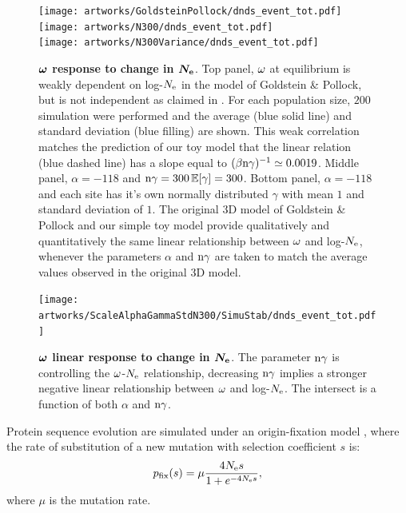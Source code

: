 \documentclass{article}
\begin{document}
\begin{figure}[htb!]
\begin{mdframed}
\centering
	\texttt{[image: artworks/GoldsteinPollock/dnds\_event\_tot.pdf]}\\
	\texttt{[image: artworks/N300/dnds\_event\_tot.pdf]}\\
	\texttt{[image: artworks/N300Variance/dnds\_event\_tot.pdf]}\\
	\caption{
		\textbf{$\bm{\omega}$ response to change in $\bm{N_{\mathrm{e}}}$}.
		Top panel, $\omega$ at equilibrium is weakly dependent on log-$N_{\mathrm{e}}$ in the model of Goldstein \& Pollock, but is not independent as claimed in \cite{Goldstein2013}.
		For each population size, $200$ simulation were performed and the average (blue solid line) and standard deviation (blue filling) are shown.
		This weak correlation matches the prediction of our toy model that the linear relation (blue dashed line) has a slope equal to $(\beta  \text{n} \gamma)^{-1} \simeq 0.0019$.
		Middle panel, $\alpha=-118$ and $\text{n} \gamma=300\operatorname{\mathbb{E}}[\gamma]=300$.
		Bottom panel, $\alpha=-118$ and each site has it's own normally distributed $\gamma$ with mean $1$ and standard deviation of $1$.
		The original $3$D model of Goldstein \& Pollock and our simple toy model provide qualitatively and quantitatively the same linear relationship between $\omega$ and log-$N_{\mathrm{e}}$, whenever the parameters $\alpha$ and $\text{n} \gamma$ are taken to match the average values observed in the original $3$D model.
		\label{fig:GoldsteinVsToy}
	}
\end{mdframed}
\end{figure}

\begin{figure}[htb!]
\begin{mdframed}
	\centering
	\texttt{[image: artworks/ScaleAlphaGammaStdN300/SimuStab/dnds\_event\_tot.pdf]}\\
	\caption{
		\textbf{$\bm{\omega}$ linear response to change in $\bm{N_{\mathrm{e}}}$}.
		The parameter $\text{n} \gamma$ is controlling the $\omega$-$N_{\mathrm{e}}$ relationship, decreasing $\text{n} \gamma$ implies a stronger negative linear relationship between $\omega$ and log-$N_{\mathrm{e}}$. The intersect is a function of both $\alpha$ and $\text{n} \gamma$.
	}
	\label{fig:EqdndsNe}
\end{mdframed}
\end{figure}

Protein sequence evolution are simulated under an origin-fixation model \cite{McCandlish2014}, where the rate of substitution of a new mutation with selection coefficient $s$ is:
\begin{equation}
p_{\text{fix}}(s) = \mu \dfrac{4 N_{\mathrm{e}} s}{1 + e^{- 4 N_{\mathrm{e}} s }}, 
\end{equation}
where $\mu$ is the mutation rate.\\
\end{document}
